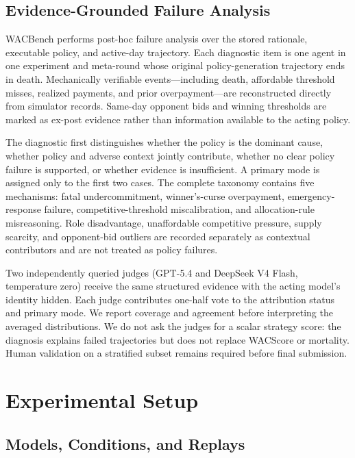 \documentclass[letterpaper]{article} %
\begin{document}
\subsection{Evidence-Grounded Failure Analysis}

WACBench performs post-hoc failure analysis over the stored rationale,
executable policy, and active-day trajectory. Each diagnostic item is one
agent in one experiment and meta-round whose original policy-generation
trajectory ends in death. Mechanically verifiable events---including death,
affordable threshold misses, realized payments, and prior overpayment---are
reconstructed directly from simulator records. Same-day opponent bids and
winning thresholds are marked as ex-post evidence rather than information
available to the acting policy.

The diagnostic first distinguishes whether the policy is the dominant cause,
whether policy and adverse context jointly contribute, whether no clear
policy failure is supported, or whether evidence is insufficient. A primary
mode is assigned only to the first two cases. The complete taxonomy contains
five mechanisms: fatal undercommitment, winner's-curse overpayment,
emergency-response failure, competitive-threshold miscalibration, and
allocation-rule misreasoning. Role disadvantage, unaffordable competitive
pressure, supply scarcity, and opponent-bid outliers are recorded separately
as contextual contributors and are not treated as policy failures.

Two independently queried judges (GPT-5.4 and DeepSeek V4 Flash, temperature
zero) receive the same structured evidence with the acting model's identity
hidden. Each judge contributes one-half vote to the attribution status and
primary mode. We report coverage and agreement before interpreting the
averaged distributions. We do not ask the judges for a scalar strategy score:
the diagnosis explains failed trajectories but does not replace WACScore or
mortality. Human validation on a stratified subset remains required before
final submission.

\section{Experimental Setup}

\subsection{Models, Conditions, and Replays}
\end{document}
